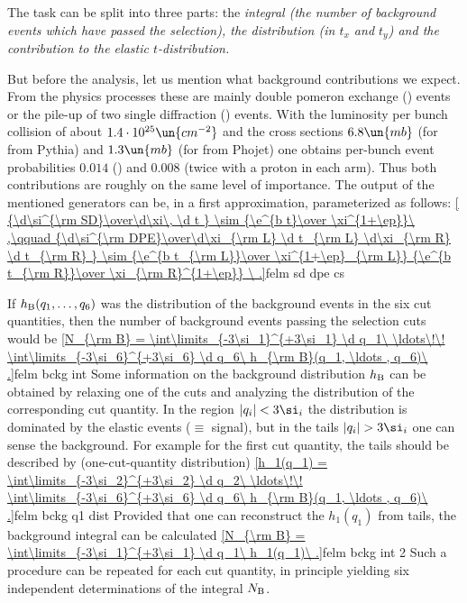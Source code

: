 The task can be split into three parts: the \em{integral} (the number of background events which have passed the selection), the \em{distribution} (in $t_x$ and $t_y$) and the \em{contribution to the elastic $t$-distribution}.

But before the analysis, let us mention what background contributions we expect. From the physics processes these are mainly double pomeron exchange () events or the pile-up of two single diffraction () events. With the luminosity per bunch collision of about $1.4\cdot10^{25}\un{cm^{-2}}$ and the cross sections $6.8\un{mb}$ (for  from Pythia) and $1.3\un{mb}$ (for  from Phojet) one obtains per-bunch event probabilities $0.014$ () and $0.008$ (twice  with a proton in each arm). Thus both contributions are roughly on the same level of importance. The output of the mentioned  generators can be, in a first approximation, parameterized as follows:
\eqref{
{\d\si^{\rm SD}\over\d\xi\, \d t } \sim {\e^{b t}\over \xi^{1+\ep}}\ ,\qquad
{\d\si^{\rm DPE}\over\d\xi_{\rm L} \d t_{\rm L} \d\xi_{\rm R} \d t_{\rm R} } \sim {\e^{b t_{\rm L}}\over \xi^{1+\ep}_{\rm L}} {\e^{b t_{\rm R}}\over \xi_{\rm R}^{1+\ep}}
\ .}{felm sd dpe cs}


If $h_{\rm B}(q_1, \ldots , q_6)$ was the distribution of the background events in the six cut quantities, then the number of background events passing the selection cuts would be
\eqref{N_{\rm B} = \int\limits_{-3\si_1}^{+3\si_1} \d q_1\ \ldots\!\! \int\limits_{-3\si_6}^{+3\si_6} \d q_6\  h_{\rm B}(q_1, \ldots , q_6)\ .}{felm bckg int}
Some information on the background distribution $h_{\rm B}$ can be obtained by relaxing one of the cuts and analyzing the distribution of the corresponding cut quantity. In the region $|q_i| < 3\si_i$ the distribution is dominated by the elastic events ($\equiv$ signal), but in the tails $|q_i|>3\si_i$ one can sense the background. For example for the first cut quantity, the tails should be described by (one-cut-quantity distribution)
\eqref{h_1(q_1) = \int\limits_{-3\si_2}^{+3\si_2} \d q_2\ \ldots\!\! \int\limits_{-3\si_6}^{+3\si_6} \d q_6\  h_{\rm B}(q_1, \ldots , q_6)\ .}{felm bckg q1 dist}
Provided that one can reconstruct the $h_1(q_1)$ from tails, the background integral can be calculated
\eqref{N_{\rm B} = \int\limits_{-3\si_1}^{+3\si_1} \d q_1\ h_1(q_1)\ .}{felm bckg int 2}
Such a procedure can be repeated for each cut quantity, in principle yielding six independent determinations of the integral $N_{\rm B}$.

